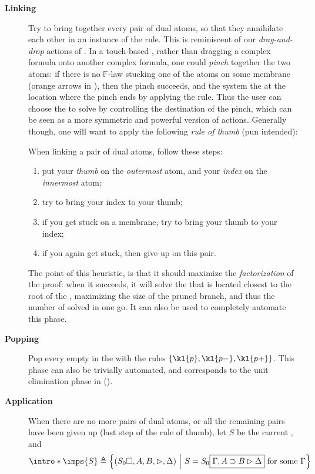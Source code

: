 \begin{scope}
\begin{description}
  \item[\textbf{Linking}] Try to bring together every pair of dual atoms, so
    that they annihilate each other in an instance of the  rule. This
    is reminiscent of our \emph{drag-and-drop} actions of . In a
    touch-based , rather than dragging a complex formula onto another
    complex formula, one could \emph{pinch} together the two atoms: if there is
    no $\mathbb{F}$-law stucking one of the atoms on some membrane (orange
    arrows in ), then the pinch succeeds, and the
    system  the  at the location where
    the pinch ends by applying the  rule. Thus the user can choose
    the  to solve by controlling the destination of the pinch, which
    can be seen as a more symmetric and powerful version of  actions.
    Generally though, one will want to apply the following \emph{rule of thumb}
    (pun intended):
    \begin{fact}
      When linking a pair of dual atoms, follow these steps:
      \begin{enumerate}
        \item put your \emph{thumb} on the \emph{outermost} atom, and your
              \emph{index} on the \emph{innermost} atom;
        \item try to bring your index to your thumb;
        \item if you get stuck on a membrane, try to bring your thumb to your
              index;
        \item if you again get stuck, then give up on this pair.
      \end{enumerate}
    \end{fact}
    The point of this heuristic, is that it should maximize the
    \emph{factorization} of the proof: when it succeeds, it will solve the
     that is located closest to the root of the , maximizing the size
    of the pruned branch, and thus the number of  solved in one go. It
    can also be used to completely automate this phase.

  \item[\textbf{Popping}] Pop every  empty  in the  with the
  rules $\{\kl{p},\kl{p{-}},\kl{p{+}}\}$. This phase can also be trivially
  automated, and corresponds to the unit elimination phase in 
  ().

  \item[\textbf{Application}] When there are no more pairs of dual atoms, or all
    the remaining pairs have been given up (last step of the rule of thumb), let
    $S$ be the current , and
    $$\intro*\imps{S} \defeq \compr{(S_0\hole, A, B, \J, \Delta)}{S = S_0\select{\Gamma,
          A \limp B \J \Delta} \text{ for some $\Gamma$}}$$


\end{description}
\end{scope}
